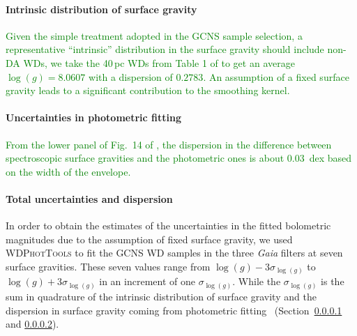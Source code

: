 \documentclass[fleqn,usenatbib]{mnras}
\begin{document}

\paragraph{Intrinsic distribution of surface gravity \hfill\\}
\label{sec:logg_intrinsic_dispersion}
\textcolor{green}{
Given the simple treatment adopted in the GCNS sample selection, a representative
``intrinsic'' distribution in the surface gravity should include non-DA WDs, we
take the 40\,pc WDs from Table 1 of \citet{2024MNRAS.527.8687O} to get an average
$\log(g)=8.0607$ with a dispersion of $0.2783$. An assumption of a fixed surface
gravity leads to a significant contribution to the smoothing kernel.
}

\paragraph{Uncertainties in photometric fitting \hfill\\}
\label{sec:logg_photometric_fitting}
\textcolor{green}{
From the lower panel of Fig.~14 of \citet{2021MNRAS.508.3877G}, the dispersion
in the difference between spectroscopic surface gravities and the photometric ones
is about 0.03~dex based on the width of the envelope.
}

\paragraph*{Total uncertainties and dispersion \hfill\\}
In order to obtain the estimates of the uncertainties in the fitted bolometric
magnitudes due to the assumption of fixed surface gravity, we used
\textsc{WDPhotTools} to fit the GCNS WD samples in the three \textit{Gaia} filters at
seven surface gravities. These seven values range from
$\log(g) - 3\sigma_{\log(g)}$ to $\log(g) + 3\sigma_{\log(g)}$
in an increment of one $\sigma_{\log(g)}$. While the $\sigma_{\log(g)}$ is the
sum in quadrature of the intrinsic distribution of surface gravity and the
dispersion in surface gravity coming from photometric fitting~
(Section~\ref{sec:logg_intrinsic_dispersion} and \ref{sec:logg_photometric_fitting}).
\end{document}
